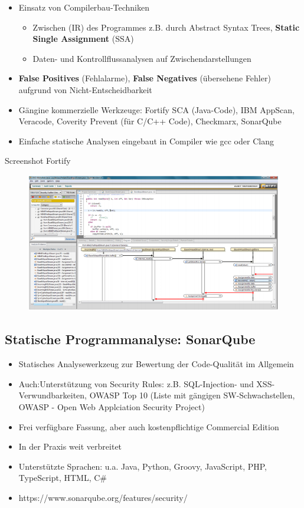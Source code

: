 \documentclass[openany]{book}
\begin{document}
\begin{itemize}
    \item Einsatz von Compilerbau-Techniken
    \begin{itemize}
        \item Zwischen (IR) des Programmes z.B. durch Abstract Syntax Trees, \textbf{Static Single Assignment} (SSA)
        \item Daten- und Kontrollflussanalysen auf Zwischendarstellungen
    \end{itemize}
    \item \textbf{False Positives} (Fehlalarme), \textbf{False Negatives} (übersehene Fehler) aufgrund von Nicht-Entscheidbarkeit
    \item Gängine kommerzielle Werkzeuge: Fortify SCA (Java-Code), IBM AppScan, Veracode, Coverity Prevent (für C/C++ Code), Checkmarx, SonarQube
    \item Einfache statische Analysen eingebaut in Compiler wie gcc oder Clang
\end{itemize}

\newpage

Screenshot Fortify

\begin{figure}[h!]
    \centering
    \includegraphics[width=0.85\linewidth]{Pics/Fortify.PNG}
\end{figure}

\subsection{Statische Programmanalyse: SonarQube}

\begin{itemize}
    \item Statisches Analysewerkzeug zur Bewertung der Code-Qualität im Allgemein
    \item Auch:Unterstützung von Security Rules: z.B. SQL-Injection- und XSS-Verwundbarkeiten, OWASP Top 10 (Liste mit gängigen SW-Schwachstellen, OWASP - Open Web Applciation Security Project)
    \item Frei verfügbare Fassung, aber auch kostenpflichtige Commercial Edition
    \item In der Praxis weit verbreitet
    \item Unterstützte Sprachen: u.a. Java, Python, Groovy, JavaScript, PHP, TypeScript, HTML, C\#
    \item https://www.sonarqube.org/features/security/
\end{itemize}
\end{document}

